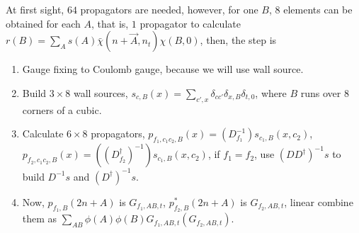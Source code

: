 At first sight, $64$ propagators are needed, however, for one $B$, $8$ elements can be obtained for each $A$, that is, $1$ propagator to calculate $r(B)=\sum _A s(A) \bar{\chi}(n+\vec{A},n_t) \chi (B,0)$, then, the step is
\begin{enumerate}
    \item Gauge fixing to Coulomb gauge, because we will use wall source.
    \item Build $3\times 8$ wall sources, $s_{c,B}(x) = \sum _{c', x}\delta _{cc'} \delta _{x,B} \delta _{t,0}$, where $B$ runs over $8$ corners of a cubic.
    \item Calculate $6 \times 8$ propagators, $p_{f_1,c_1c_2,B}(x)=(D_{f_1}^{-1})s_{c_1,B}(x,c_2)$, $p_{f_2,c_1c_2,B}(x)=((D_{f_2}^{\dagger})^{-1})s_{c_1,B}(x,c_2)$, if $f_1=f_2$, use $(DD^{\dagger})^{-1} s$ to build $D^{-1}s$ and $(D^{\dagger})^{-1}s$.
    \item Now, $p_{f_1,B}(2n+A)$ is $G_{f_1,AB,t}$, $p^*_{f_2,B}(2n+A)$ is $G_{f_2,AB,t}$, linear combine them as $\sum _{AB}\phi(A)\phi(B) G_{f_1,AB,t} \left(G_{f_2,AB,t}\right)$.
\end{enumerate}


